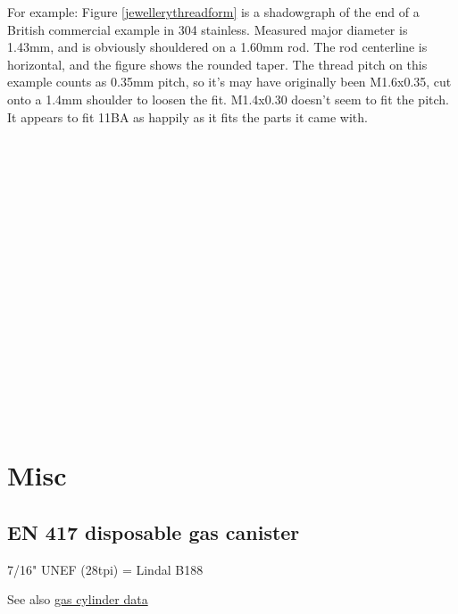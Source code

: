 For example: Figure \ref{jewellerythreadform} is a shadowgraph of the end of a British commercial example in 304 stainless.  Measured major diameter is 1.43mm, and is obviously shouldered on a 1.60mm rod. The rod centerline is horizontal, and the figure shows the rounded taper.  The thread pitch on this example counts as 0.35mm pitch, so it's may have originally been M1.6x0.35, cut onto a 1.4mm shoulder to loosen the fit.  M1.4x0.30 doesn't seem to fit the pitch.  It appears to fit 11BA as happily as it fits the parts it came with.
\\ \\ \\ \\ \\ \\ \\ \\ \\ \\ \\ \\ \\ \\ \\ \\ \\ \\               



\clearpage
\section{Misc}
\subsection{EN 417 disposable gas canister}\label{gas_cylinder_threads}
7/16" UNEF (28tpi) = Lindal B188 

See also \hyperref[gas_cylinders]{gas cylinder data}

\clearpage
